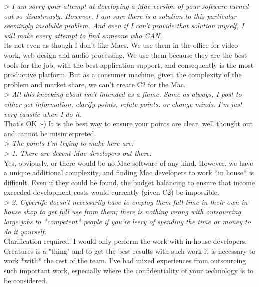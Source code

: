 \documentclass[11pt,twoside,a4paper]{article}
\begin{document}
\begin{multicols*}{2}
\emph{> I am sorry your attempt at developing a Mac version of your software turned out so disastrously. However, I am sure there is a solution to this particular seemingly insoluble problem. And even if I can't provide that solution myself, I will make every attempt to find someone who CAN.}~\\

Its not even as though I don't like Macs. We use them in the office for video work, web design and audio processing. We use them because they are the best tools for the job, with the best application support, and consequently is the most productive platform. But as a consumer machine, given the complexity of the problem and market share, we can't create C2 for the Mac.~\\

\emph{> All this knocking about isn't intended as a flame. Same as always, I post to either get information, clarify points, refute points, or change minds. I'm just very caustic when I do it.}~\\

That's OK :-) It is the best way to ensure your points are clear, well thought out and cannot be misinterpreted.~\\

\emph{> The points I'm trying to make here are:}~\\
\emph{> 1. There are decent Mac developers out there.}~\\

Yes, obviously, or there would be no Mac software of any kind. However, we have a unique additional complexity, and finding Mac developers to work *in house* is difficult. Even if they could be found, the budget balancing to ensure that income exceeded development costs would currently (given C2) be impossible.~\\

\emph{> 2. Cyberlife doesn't necessarily have to employ them full-time in their own in-house shop to get full use from them; there is nothing wrong with outsourcing large jobs to *competent* people if you're leery of spending the time or money to do it yourself.}~\\

Clarification required. I would only perform the work with in-house developers. Creatures is a "thing" and to get the best results with such work it is necessary to work *with* the rest of the team. I've had mixed experiences from outsourcing such important work, especially where the confidentiality of your technology is to be considered.~\\


\end{multicols*}
\end{document}
